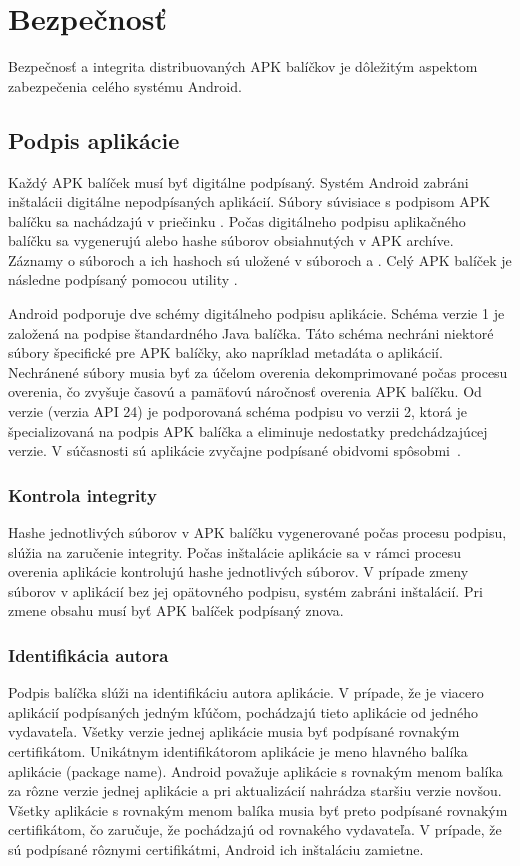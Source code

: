 \section{Bezpečnosť}

Bezpečnosť a integrita distribuovaných APK balíčkov je dôležitým aspektom zabezpečenia celého systému Android.

\subsection{Podpis aplikácie}

Každý APK balíček musí byť digitálne podpísaný. Systém Android zabráni inštalácii digitálne nepodpísaných aplikácií. 
Súbory súvisiace s podpisom APK balíčku sa nachádzajú v priečinku . Počas digitálneho podpisu aplikačného balíčku sa vygenerujú  alebo  hashe súborov obsiahnutých v APK archíve. Záznamy o súboroch a ich hashoch sú uložené v súboroch  a . Celý APK balíček je následne podpísaný pomocou utility . 

Android podporuje dve schémy digitálneho podpisu aplikácie. Schéma verzie 1 je založená na podpise štandardného Java balíčka. Táto schéma nechráni niektoré súbory špecifické pre APK balíčky, ako napríklad metadáta o aplikácií. Nechránené súbory musia byť za účelom overenia dekomprimované počas procesu overenia, čo zvyšuje časovú a pamäťovú náročnosť overenia APK balíčku.  Od verzie  (verzia API 24) je podporovaná schéma podpisu vo verzii 2, ktorá je špecializovaná na podpis APK balíčka a eliminuje nedostatky predchádzajúcej verzie. V súčasnosti sú aplikácie zvyčajne podpísané obidvomi spôsobmi~\cite{NT0FrzQIkOAYbG2Ga}.

\subsubsection{\textbf{Kontrola integrity}}
Hashe jednotlivých súborov v APK balíčku vygenerované počas procesu podpisu, slúžia na zaručenie integrity. Počas inštalácie aplikácie sa v rámci procesu overenia aplikácie kontrolujú hashe jednotlivých súborov. V prípade zmeny súborov v aplikácií bez jej opätovného podpisu, systém zabráni inštalácií. Pri zmene obsahu musí byť APK balíček podpísaný znova. 

\subsubsection{\textbf{Identifikácia autora}}
Podpis balíčka slúži na identifikáciu autora aplikácie. V prípade, že je viacero aplikácií podpísaných jedným kľúčom, pochádzajú tieto aplikácie od jedného vydavateľa. 
Všetky verzie jednej aplikácie musia byť podpísané rovnakým certifikátom. Unikátnym identifikátorom aplikácie je meno hlavného balíka aplikácie (package name). Android považuje aplikácie s rovnakým menom balíka za rôzne verzie jednej aplikácie a pri aktualizácií nahrádza staršiu verzie novšou. Všetky aplikácie s rovnakým menom balíka musia byť preto podpísané rovnakým certifikátom, čo zaručuje, že pochádzajú od rovnakého vydavateľa.  V prípade, že sú podpísané rôznymi certifikátmi, Android ich inštaláciu zamietne. 

